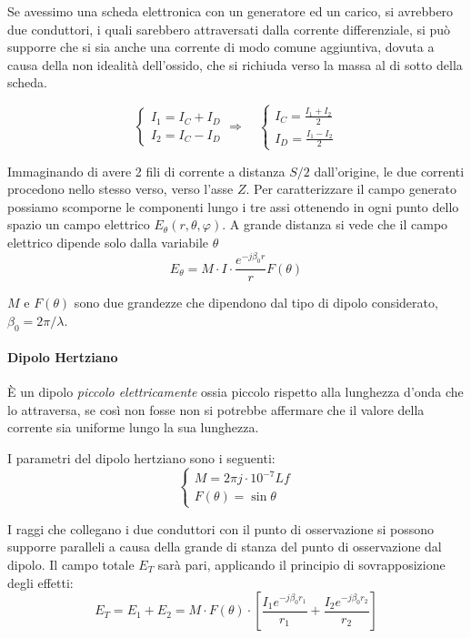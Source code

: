 
Se avessimo una scheda elettronica con un generatore ed un carico,
si avrebbero due conduttori, i quali sarebbero attraversati dalla corrente
differenziale, si può supporre che si sia anche una corrente
di modo comune aggiuntiva, dovuta a causa della non idealità dell'ossido,
che si richiuda verso la massa al di sotto della scheda.

$$
\begin{cases}
I_1 = I_C + I_D \\
I_2 = I_C - I_D
\end{cases}
\Rightarrow \quad
\begin{cases}
I_C = \frac{I_1+I_2}{2} \\
I_D = \frac{I_1-I_2}{2}
\end{cases}
$$

Immaginando di avere 2 fili di corrente a distanza $S/2$ dall'origine,
le due correnti procedono nello stesso verso, verso l'asse $Z$.
Per caratterizzare il campo generato possiamo scomporne le componenti lungo i tre assi
ottenendo in ogni punto dello spazio un campo elettrico $E_\theta(r,\theta,\varphi)$.
A grande distanza si vede che il campo elettrico dipende solo dalla variabile $\theta$
$$
 E_\theta = M \cdot I \cdot \frac{e^{-j\beta_0 r}}{r} F(\theta)
$$

$M$ e $F(\theta)$ sono due grandezze che dipendono dal tipo di dipolo considerato, $\beta_0 = 2\pi/\lambda$.

\paragraph{Dipolo Hertziano} È un dipolo \textit{piccolo elettricamente}
ossia piccolo rispetto alla lunghezza d'onda che lo attraversa, se così
non fosse non si potrebbe affermare che il valore della corrente sia
uniforme lungo la sua lunghezza.

I parametri del dipolo hertziano sono i seguenti:
$$
\begin{cases}
M =  2\pi j \cdot 10^{-7} L f \\
F(\theta) = \sin \theta
\end{cases}
$$

I raggi che collegano i due conduttori con il punto di osservazione si possono supporre paralleli
a causa della grande di stanza del punto di osservazione dal dipolo.
Il campo totale $E_T$ sarà pari, applicando il principio di sovrapposizione degli effetti:
$$
 E_T = E_1 + E_2 = M\cdot F(\theta)\cdot \left[\frac{I_1 e^{-j\beta_0 r_1}}{r_1} +\frac{I_2 e^{-j\beta_0 r_2}}{r_2}  \right]
$$

